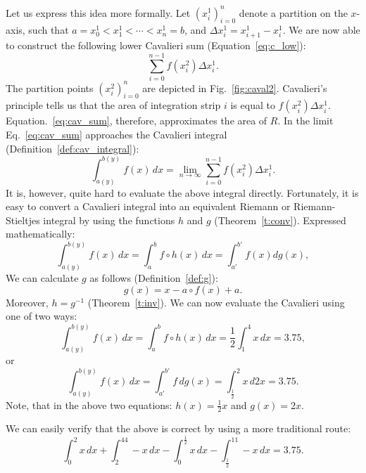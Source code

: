 \documentclass[twoside,reqno,11pt]{fcaa-var} %
\begin{document}
Let us express this idea more formally. Let $(x_i^1)_{i=0}^{n}$ denote a partition on the $x$-axis, such that $a = x_0^1 < x_1^1 < \cdots < x_n^1 = b$, and $\Delta x_i^1 = x_{i+1}^1 - x_i^1$.
We are now able to construct the following lower Cavalieri sum (Equation~\ref{eq:c_low}):
\begin{equation}
\label{eq:cav_sum}
\sum_{i=0}^{n-1} f(x_i^2)\Delta x_i^1.
\end{equation}
The partition points $(x_i^2)_{i=0}^{n}$ are depicted in Fig.~\ref{fig:caval2}. Cavalieri's principle tells us that the area of integration strip $i$ is equal to $f(x_i^2)\Delta x_i^1$. Equation.~\eqref{eq:cav_sum}, therefore, approximates the area of $R$. In the limit Eq.~\eqref{eq:cav_sum} approaches 
the Cavalieri integral (Definition~\ref{def:cav_integral}):
\begin{equation}
\label{eq:caval1}
\int_{a(y)}^{b(y)}f(x)\, dx = \lim_{n\to \infty}\sum_{i=0}^{n-1} f(x_i^2)\Delta x_i^1.
\end{equation}
It is, however, quite hard to evaluate the above integral directly. Fortunately, it is easy to convert a Cavalieri integral into an equivalent Riemann or Riemann-Stieltjes 
integral by using the functions $h$ and $g$ (Theorem~\ref{t:conv}). Expressed mathematically:
\begin{equation}
\label{eq:main_cav}
\int_{a(y)}^{b(y)}f(x)\,dx =\int_a^b f \circ h (x)\, dx = \int_{a'}^{b'} f(x) dg(x),
\end{equation}
We can calculate $g$ as follows (Definition~\ref{def:g}):
\begin{equation}
g(x) = x - a\circ f(x) + a.
\end{equation}
Moreover, $h=g^{-1}$ (Theorem~\ref{t:inv}). We can now evaluate the Cavalieri using one of two ways:
\begin{equation}
\int_{a(y)}^{b(y)}f(x)\, dx = \int_a^b f \circ h (x)\, dx = \dfrac{1}{2}\int_1^4x\, dx = 3.75,  
\end{equation}
or
\begin{equation}
\int_{a(y)}^{b(y)}f(x)\, dx = \int_{a'}^{b'} f \, dg(x) = \int_{\frac{1}{2}}^2x\, d2x = 3.75.  
\end{equation}
Note, that in the above two equations: $h(x) = \frac{1}{2}x$ and $g(x) = 2x$. 

We can easily verify that the above is correct by using a more traditional route:
\begin{equation}
\int_0^2x\, dx+\int_2^44-x\, dx- \int_0^{\frac{1}{2}}x\, dx-\int_{\frac{1}{2}}^11-x\, dx = 3.75. 
\end{equation}
\end{document}

